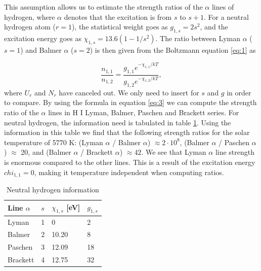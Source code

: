 \documentclass[a4paper,11.5pt,]{article}
\begin{document}
\begin{multicols}{2}
This assumption allows us to estimate the strength ratios of the $\alpha$ lines of hydrogen, where $\alpha$ denotes that the excitation is from $s$ to $s+1$.  For a neutral hydrogen atom ($r = 1$), the statistical weight goes as $g_{1,s} = 2s^2$, and the excitation energy goes as $\chi_{1,s} = 13.6 (1- 1/s^2)$. The ratio between Lyman $\alpha$ ($s=1$) and Balmer $\alpha$ ($s=2$) is then given from the Boltzmann equation \eqref{eq:1} as

\begin{equation}\label{eq:3}
    \frac{n_{1,1}}{n_{1,2}} = \frac{g_{1,1}e^{-\chi_{1,1}/kT}}{g_{1,2} e^{-\chi_{1,2}/kT}},
\end{equation}
where $U_r$ and $N_r$ have canceled out. We only need to insert for $s$ and $g$ in order to compare. By using the formula in equation \eqref{eq:3} we can compute the strength ratio of the $\alpha$ lines in H I Lyman, Balmer, Paschen and Brackett series. For neutral hydrogen, the information need is tabulated in table \ref{tab:1}. Using the information in this table we find that the following strength ratios for the solar temperature of 5770 K: (Lyman $\alpha$ / Balmer $\alpha$) $\approx 2 \cdot 10^8$, (Balmer $\alpha$ / Paschen $\alpha$) $\approx $ 20, and (Balmer $\alpha$ / Brackett $\alpha$) $\approx 42$. We see that Lyman $\alpha$ line strength is enormous compared to the other lines. This is a result of the excitation energy $chi_{1,1} = 0$, making it temperature independent when computing ratios.

\begin{table}[H]
\begin{center}
\begin{tabular}{llll}
\hline
Line $\alpha$ & $s$ & $\chi_{1,s} $ {[}eV{]} & $g_{1,s}$ \\ \hline
Lyman         & 1   & 0                      & 2          \\
Balmer        & 2   & 10.20                  & 8          \\
Paschen       & 3   & 12.09                  & 18         \\
Brackett      & 4   & 12.75                  & 32         \\ \hline

\end{tabular}
\caption{Neutral hydrogen information}
\label{tab:1}
\end{center}
\end{table}






\end{multicols}
\end{document}
